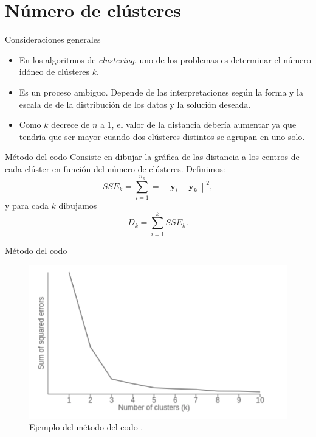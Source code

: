\documentclass[spanish]{beamer}
\newcommand{\norm}[1]{\left\lVert#1\right\rVert}
\newcommand{\yy}{\textbf{y}}
\begin{document}
\section{Número de clústeres}
\begin{frame}{Consideraciones generales}
	\begin{itemize}
		\item En los algoritmos de \textit{clustering}, uno de los problemas es determinar el número idóneo de clústeres $ k $. 
		\item Es un proceso ambiguo. Depende de las interpretaciones según la forma y la escala de de la distribución de los datos y la solución deseada.
		\item Como $ k $ decrece de $ n $ a 1, el valor de la distancia debería aumentar ya que tendría que ser mayor cuando dos clústeres distintos se agrupan en uno solo.
	\end{itemize}
\end{frame}

\begin{frame}{Método del codo}
	Consiste en dibujar la gráfica de las distancia a los centros de cada clúster en función del número de clústeres. Definimos:
	\[
	SSE_k = \sum_{i = 1}^{n_k} = \norm{\yy_i - \bar{\yy}_k}^2,
	\]
	y para cada $ k $ dibujamos
	\[
	D_k = \sum_{i = 1} ^ {k} SSE_k.
	\]
\end{frame}

\begin{frame}{Método del codo}
	\begin{figure}[h]
		\centering
		\includegraphics[scale=0.5]{pedro/elbowGraph}
		\caption{Ejemplo del método del codo \cite{elbowGraph}.}
		\label{smkm}
	\end{figure}
\end{frame}
\end{document}
